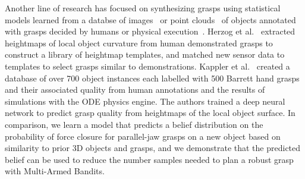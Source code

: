 Another line of research has focused on synthesizing grasps using statistical models learned from a databse of images~\cite{lenz2015deep} or point clouds~\cite{detry2013learning, herzog2014learning} of objects annotated with grasps decided by humans or physical execution~\cite{bohg2014data}.
Herzog et al.~\cite{herzog2014learning} extracted heightmaps of local object curvature from human demonstrated grasps to construct a library of heightmap templates, and matched new sensor data to templates to select grasps similar to demonstrations.
Kappler et al.~\cite{kappler2015leveraging} created a database of over 700 object instances each labelled with 500 Barrett hand grasps and their associated quality from human annotations and the results of simulations with the ODE physics engine.
The authors trained a deep neural network to predict grasp quality from heightmaps of the local object surface.
In comparison, we learn a model that predicts a belief distribution on the probability of force closure for parallel-jaw grasps on a new object based on similarity to prior 3D objects and grasps, and we demonstrate that the predicted belief can be used to reduce the number samples needed to plan a robust grasp with Multi-Armed Bandits.

